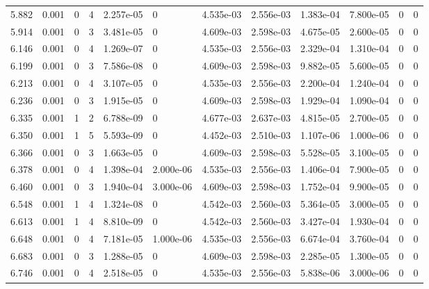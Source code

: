 \documentclass[preview]{standalone}
\begin{document}
{{{\begin{tabular}{L{1.2cm}C{1.2cm} C{0.3cm}C{0.5cm} C{1.4cm}C{1.4cm} C{1.4cm}C{1.4cm} C{1.6cm}C{1.6cm} C{1.6cm}C{1.6cm}}
  5.882  &  0.001  & 0     &  4 &  2.257e-05  & 0  &  4.535e-03&   2.556e-03& 1.383e-04 & 7.800e-05   &  0 & 0  \\ 
  5.914  &  0.001  & 0     &  3 &  3.481e-05  & 0  &  4.609e-03&   2.598e-03& 4.675e-05 & 2.600e-05   &  0 & 0  \\ 
  6.146  &  0.001  & 0     &  4 &  1.269e-07  & 0  &  4.535e-03&   2.556e-03& 2.329e-04 & 1.310e-04   &  0 & 0  \\ 
  6.199  &  0.001  & 0     &  3 &  7.586e-08  & 0  &  4.609e-03&   2.598e-03& 9.882e-05 & 5.600e-05   &  0 & 0  \\ 
  6.213  &  0.001  & 0     &  4 &  3.107e-05  & 0  &  4.535e-03&   2.556e-03& 2.200e-04 & 1.240e-04   &  0 & 0  \\ 
  6.236  &  0.001  & 0     &  3 &  1.915e-05  & 0  &  4.609e-03&   2.598e-03& 1.929e-04 & 1.090e-04   &  0 & 0  \\ 
  6.335  &  0.001  & 1     &  2 &  6.788e-09  & 0  &  4.677e-03&   2.637e-03& 4.815e-05 & 2.700e-05   &  0 & 0  \\ 
  6.350  &  0.001  & 1     &  5 &  5.593e-09  & 0  &  4.452e-03&   2.510e-03& 1.107e-06 & 1.000e-06   &  0 & 0  \\ 
  6.366  &  0.001  & 0     &  3 &  1.663e-05  & 0  &  4.609e-03&   2.598e-03& 5.528e-05 & 3.100e-05   &  0 & 0  \\ 
  6.378  &  0.001  & 0     &  4 &  1.398e-04  & 2.000e-06  &  4.535e-03&   2.556e-03& 1.406e-04 & 7.900e-05   &  0 & 0  \\ 
  6.460  &  0.001  & 0     &  3 &  1.940e-04  & 3.000e-06  &  4.609e-03&   2.598e-03& 1.752e-04 & 9.900e-05   &  0 & 0  \\ 
  6.548  &  0.001  & 1     &  4 &  1.324e-08  & 0  &  4.542e-03&   2.560e-03& 5.364e-05 & 3.000e-05   &  0 & 0  \\ 
  6.613  &  0.001  & 1     &  4 &  8.810e-09  & 0  &  4.542e-03&   2.560e-03& 3.427e-04 & 1.930e-04   &  0 & 0  \\ 
  6.648  &  0.001  & 0     &  4 &  7.181e-05  & 1.000e-06  &  4.535e-03&   2.556e-03& 6.674e-04 & 3.760e-04   &  0 & 0  \\ 
  6.683  &  0.001  & 0     &  3 &  1.288e-05  & 0  &  4.609e-03&   2.598e-03& 2.285e-05 & 1.300e-05   &  0 & 0  \\ 
  6.746  &  0.001  & 0     &  4 &  2.518e-05  & 0  &  4.535e-03&   2.556e-03& 5.838e-06 & 3.000e-06   &  0 & 0  \\ 
\hline 
\end{tabular} 

}}}
\end{document}
